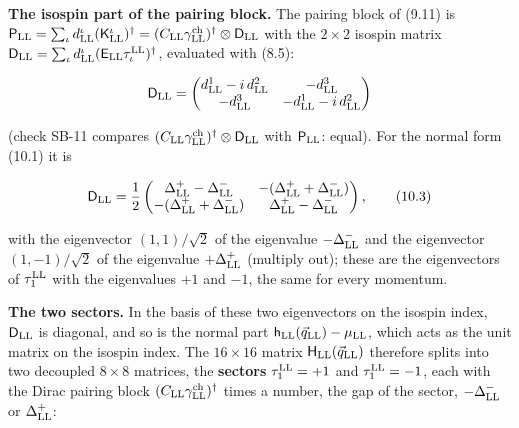 \documentclass[
  10pt,
]{article}
\begin{document}
\textbf{The isospin part of the pairing block.} The pairing block of
(9.11) is
\(\mathsf P_{\rm LL}=\sum_\iota d^\iota_{\rm LL}(\mathsf K^\iota_{\rm LL})^\dagger=(C_{\rm LL}\gamma^{\rm ch}_{\rm LL})^\dagger\otimes\mathsf D_{\rm LL}\)
with the \(2\times2\) isospin matrix
\(\mathsf D_{\rm LL}=\sum_\iota d^\iota_{\rm LL}(\mathsf E_{\rm LL}\tau^{\rm LL}_\iota)^\dagger\),
evaluated with (8.5):

\[\mathsf D_{\rm LL}=\begin{pmatrix}d^1_{\rm LL}-i\,d^2_{\rm LL}&-d^3_{\rm LL}\\-d^3_{\rm LL}&-d^1_{\rm LL}-i\,d^2_{\rm LL}\end{pmatrix}\]

(check SB-11 compares
\((C_{\rm LL}\gamma^{\rm ch}_{\rm LL})^\dagger\otimes\mathsf D_{\rm LL}\)
with \(\mathsf P_{\rm LL}\): equal). For the normal form (10.1) it is

\[\mathsf D_{\rm LL}=\frac12\begin{pmatrix}\Delta^+_{\rm LL}-\Delta^-_{\rm LL}&-(\Delta^+_{\rm LL}+\Delta^-_{\rm LL})\\-(\Delta^+_{\rm LL}+\Delta^-_{\rm LL})&\Delta^+_{\rm LL}-\Delta^-_{\rm LL}\end{pmatrix},\tag{10.3}\]

with the eigenvector \((1,1)/\sqrt2\) of the eigenvalue
\(-\Delta^-_{\rm LL}\) and the eigenvector \((1,-1)/\sqrt2\) of the
eigenvalue \(+\Delta^+_{\rm LL}\) (multiply out); these are the
eigenvectors of \(\tau^{\rm LL}_1\) with the eigenvalues \(+1\) and
\(-1\), the same for every momentum.

\textbf{The two sectors.} In the basis of these two eigenvectors on the
isospin index, \(\mathsf D_{\rm LL}\) is diagonal, and so is the normal
part \(\mathsf h_{\rm LL}(\vec q_{\rm LL})-\mu_{\rm LL}\), which acts as
the unit matrix on the isospin index. The \(16\times16\) matrix
\(\mathsf H_{\rm LL}(\vec q_{\rm LL})\) therefore splits into two
decoupled \(8\times8\) matrices, the \textbf{sectors}
\(\tau^{\rm LL}_1=+1\) and \(\tau^{\rm LL}_1=-1\), each with the Dirac
pairing block \((C_{\rm LL}\gamma^{\rm ch}_{\rm LL})^\dagger\) times a
number, the gap of the sector, \(-\Delta^-_{\rm LL}\) or
\(\Delta^+_{\rm LL}\):
\end{document}
